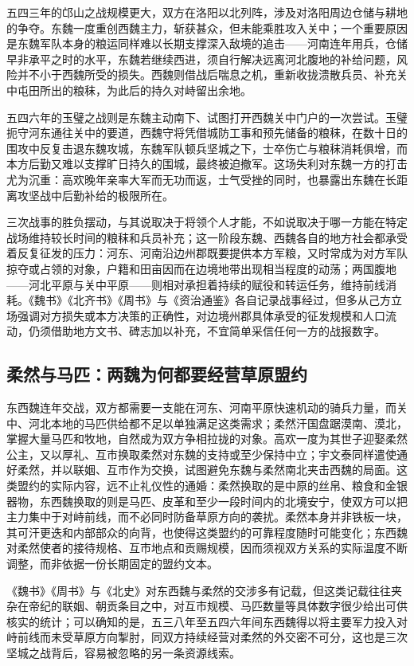 五四三年的邙山之战规模更大，双方在洛阳以北列阵，涉及对洛阳周边仓储与耕地的争夺。东魏一度重创西魏主力，斩获甚众，但未能乘胜攻入关中；一个重要原因是东魏军队本身的粮运同样难以长期支撑深入敌境的追击——河南连年用兵，仓储早非承平之时的水平，东魏若继续西进，须自行解决远离河北腹地的补给问题，风险并不小于西魏所受的损失。西魏则借战后喘息之机，重新收拢溃散兵员、补充关中屯田所出的粮秣，为此后的持久对峙留出余地。

五四六年的玉璧之战则是东魏主动南下、试图打开西魏关中门户的一次尝试。玉璧扼守河东通往关中的要道，西魏守将凭借城防工事和预先储备的粮秣，在数十日的围攻中反复击退东魏攻城，东魏军队顿兵坚城之下，士卒伤亡与粮秣消耗俱增，而本方后勤又难以支撑旷日持久的围城，最终被迫撤军。这场失利对东魏一方的打击尤为沉重：高欢晚年亲率大军而无功而返，士气受挫的同时，也暴露出东魏在长距离攻坚战中后勤补给的极限所在。

三次战事的胜负摆动，与其说取决于将领个人才能，不如说取决于哪一方能在特定战场维持较长时间的粮秣和兵员补充；这一阶段东魏、西魏各自的地方社会都承受着反复征发的压力：河东、河南沿边州郡既要提供本方军粮，又时常成为对方军队掠夺或占领的对象，户籍和田亩因而在边境地带出现相当程度的动荡；两国腹地——河北平原与关中平原——则相对承担着持续的赋役和转运任务，维持前线消耗。《魏书》《北齐书》《周书》与《资治通鉴》各自记录战事经过，但多从己方立场强调对方损失或本方决策的正确性，对边境州郡具体承受的征发规模和人口流动，仍须借助地方文书、碑志加以补充，不宜简单采信任何一方的战报数字。

\subsection{柔然与马匹：两魏为何都要经营草原盟约}

东西魏连年交战，双方都需要一支能在河东、河南平原快速机动的骑兵力量，而关中、河北本地的马匹供给都不足以单独满足这类需求；柔然汗国盘踞漠南、漠北，掌握大量马匹和牧地，自然成为双方争相拉拢的对象。高欢一度为其世子迎娶柔然公主，又以厚礼、互市换取柔然对东魏的支持或至少保持中立；宇文泰同样遣使通好柔然，并以联姻、互市作为交换，试图避免东魏与柔然南北夹击西魏的局面。这类盟约的实际内容，远不止礼仪性的通婚：柔然换取的是中原的丝帛、粮食和金银器物，东西魏换取的则是马匹、皮革和至少一段时间内的北境安宁，使双方可以把主力集中于对峙前线，而不必同时防备草原方向的袭扰。柔然本身并非铁板一块，其可汗更迭和内部部众的向背，也使得这类盟约的可靠程度随时可能变化；东西魏对柔然使者的接待规格、互市地点和贡赐规模，因而须视双方关系的实际温度不断调整，而非依据一份长期固定的盟约文本。

《魏书》《周书》与《北史》对东西魏与柔然的交涉多有记载，但这类记载往往夹杂在帝纪的联姻、朝贡条目之中，对互市规模、马匹数量等具体数字很少给出可供核实的统计；可以确知的是，五三八年至五四六年间东西魏得以将主要军力投入对峙前线而未受草原方向掣肘，同双方持续经营对柔然的外交密不可分，这也是三次坚城之战背后，容易被忽略的另一条资源线索。

